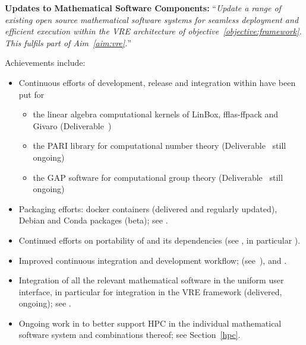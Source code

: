 \begin{compactenum}[\bf {Obj} 1\rm]

\item \label{objective:updates}
  \textbf{Updates to Mathematical Software Components:}
  ``\emph{Update a range of existing open source
  mathematical software systems for seamless deployment and efficient
  execution within the VRE architecture of objective~\ref{objective:framework}.
  This fulfils part of Aim~\ref{aim:vre}.}''


  Achievements include:
  \begin{itemize}
  \item Continuous efforts of development, release and integration within \Sage
    have been put for
    \begin{itemize}
    \item  the linear algebra computational kernels of LinBox,
      fflas-ffpack and Givaro (Deliverable~)
    \item the PARI library for computational number theory
      (Deliverable~ still ongoing)
    \item the GAP software for computational group theory
      (Deliverable~ still ongoing)
    \end{itemize}
  \item Packaging efforts: docker containers (delivered and regularly
    updated), Debian and Conda packages (beta); see
    .
  \item Continued efforts on portability of \Sage and its dependencies
    (see , in
    particular ).
  \item Improved continuous integration and development workflow;
    (see~), and
    .
  \item Integration of all the relevant mathematical software in the
    uniform \Jupyter user interface, in particular for integration in
    the VRE framework (delivered, ongoing); see
    .
  \item Ongoing work in  to better support HPC in the
    individual mathematical software system and combinations thereof;
    see Section~\ref{hpc}.
  \end{itemize}


\end{compactenum}
